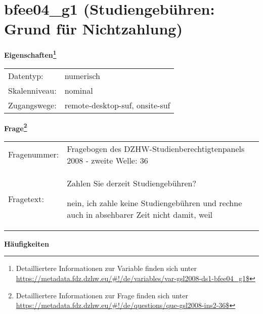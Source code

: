 
    \setcounter{footnote}{0}

    \vspace*{-1.8cm}
	\section{bfee04\_g1 (Studiengebühren: Grund für Nichtzahlung)}
	\label{section:bfee04_g1}



    \vspace*{0.5cm}
    \noindent\textbf{Eigenschaften\footnote{Detailliertere Informationen zur Variable finden sich unter
		\url{https://metadata.fdz.dzhw.eu/\#!/de/variables/var-gsl2008-ds1-bfee04_g1$}}}\\
	\begin{tabularx}{\hsize}{@{}lX}
	Datentyp: & numerisch \\
	Skalenniveau: & nominal \\
	Zugangswege: &
	  remote-desktop-suf, 
	  onsite-suf
 \\
    \end{tabularx}



				\vspace*{0.5cm}
                \noindent\textbf{Frage\footnote{Detailliertere Informationen zur Frage finden sich unter
		              \url{https://metadata.fdz.dzhw.eu/\#!/de/questions/que-gsl2008-ins2-36$}}}\\
				\begin{tabularx}{\hsize}{@{}lX}
					Fragenummer: &
					  Fragebogen des DZHW-Studienberechtigtenpanels 2008 - zweite Welle:
					  36
 \\
					Fragetext: & Zahlen Sie derzeit Studiengebühren?\par  nein, ich zahle keine Studiengebühren und rechne auch in absehbarer Zeit nicht damit, weil \\
				\end{tabularx}





        		\vspace*{0.5cm}
                \noindent\textbf{Häufigkeiten}

